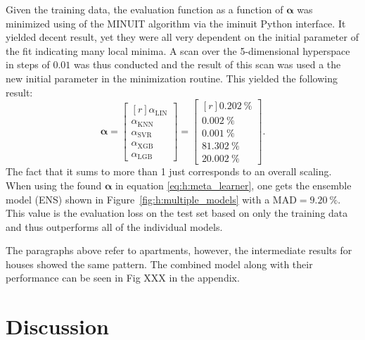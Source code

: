 Given the training data, the evaluation function as a function of $\bm{\alpha}$ was minimized using of the MINUIT algorithm\cite{1975CoPhC..10..343J} via the iminuit\cite{iminuit} Python interface. It yielded decent result, yet they were all very dependent on the initial parameter of the fit indicating many local minima. A scan over the 5-dimensional hyperspace in steps of $0.01$ was thus conducted and the result of this scan was used a the new initial parameter in the minimization routine. This yielded the following result:
\begin{equation}
  \bm{\alpha} = \begin{bmatrix*}[r] \alpha_\mathrm{LIN} \\  \alpha_\mathrm{KNN} \\ \alpha_\mathrm{SVR} \\ \alpha_\mathrm{XGB} \\ \alpha_\mathrm{LGB} \end{bmatrix*} = \begin{bmatrix*}[r] \SI{0.202}{\percent} \\  \SI{0.002}{\percent} \\\SI{0.001}{\percent} \\\SI{81.302}{\percent} \\\SI{20.002}{\percent} \end{bmatrix*}.
\end{equation}
The fact that it sums to more than \num{1} just corresponds to an overall scaling. When using the found $\bm{\alpha}$ in equation \eqref{eq:h:meta_learner}, one gets the ensemble model (ENS) shown in Figure~\ref{fig:h:multiple_models} with a $\mathrm{MAD} = \SI{9.20}{\percent}$. This value is the evaluation loss on the test set based on only the training data and thus outperforms all of the individual models. 

The paragraphs above refer to apartments, however, the intermediate results for houses showed the same pattern. The combined model along with their performance can be seen in Fig XXX in the appendix. 

\section{Discussion}

